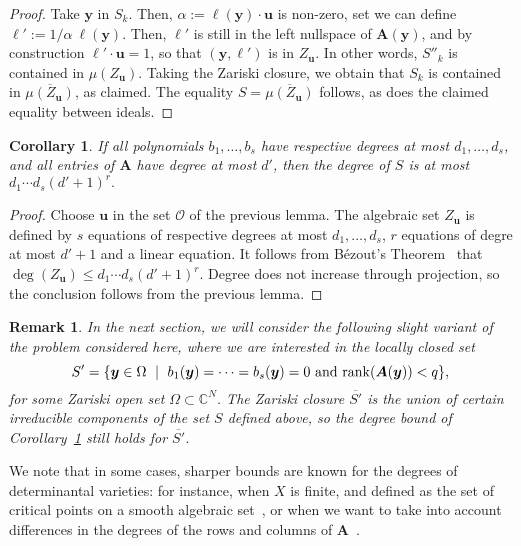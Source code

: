 \documentclass[12pt]{article}
\def\X{S}
\def\yb{{\bm y}}
\def\C{\mathbb{C}}
\newtheorem{corollary}[theorem]{Corollary}
\newtheorem{remark}[theorem]{Remark}
\begin{document}
\begin{proof}
  Take $\bm y$ in $\X_k$. Then, $\alpha:=\bm \ell(\bm y)\cdot \bm u$
  is non-zero, set we can define $\bm \ell' := 1/\alpha\ \bm\ell(\bm y)$.
  Then, $\bm \ell'$ is still in the left nullspace of $\bm A(\bm y)$,
  and by construction $ \bm \ell'\cdot \bm u =1$, so that $(\bm y, \bm
  \ell')$ is in $Z_{\bm u}$. In other words, $\X''_k$ is contained in
  $\mu(Z_{\bm u})$. Taking the Zariski closure, we obtain that $\X_k$ 
  is contained in $\overline{\mu(Z_{\bm u})}$, as claimed. 
  The equality $\X = \overline{\mu(Z_{\bm u})}$ follows, as does the
  claimed equality between ideals.
\end{proof}

\begin{corollary} \label{coro:degree}
  If all polynomials $b_1,\dots,b_s$ have respective degrees at most
  $d_1,\dots,d_s$, and all entries of $\bm A$ have degree at most
  $d'$, then the degree of $\X$ is at most $d_1 \cdots d_s (d'+1)^r.$
\end{corollary}
\begin{proof}
  Choose $\bm u$ in the set $\mathscr{O}$ of the previous lemma.  The
  algebraic set $Z_{\bm u}$ is defined by $s$ equations of respective
  degrees at most $d_1,\dots,d_s$, $r$ equations of degre at most
  $d'+1$ and a linear equation. It follows from B\'ezout's
  Theorem~\cite{H} that $\deg(Z_{\bm u}) \leq d_1 \cdots d_s
  (d'+1)^r$. Degree does not increase through projection, so the
  conclusion follows from the previous lemma.
\end{proof}

\begin{remark}\label{rk:degree}
  In the next section, we will consider the following slight variant
  of the problem considered here, where we are interested in the
  locally closed set
  \[\X' = \{\yb \in \Omega \ \mid \ b_1(\yb) = \cdots = b_s(\yb) =0 
  \text{~and~} {\rm rank}(\bm A(\yb)) < q\},\] for some Zariski open
  set $\Omega \subset \C^N$.  The Zariski closure $\overline{\X'}$ is
  the union of certain irreducible components of the set $\X$ defined
  above, so the degree bound of Corollary~\ref{coro:degree} still
  holds for $\overline{\X'}$.
\end{remark}

We note that in some cases, sharper bounds are known for the degrees
of determinantal varieties: for instance, when $X$ is finite, and
defined as the set of critical points on a smooth algebraic
set~\cite{SaSp16}, or when we want to take into account differences in
the degrees of the rows and columns of $\bm
A$~\cite{Spa14,NieRan09,HaSaScVu18}.
\end{document}
